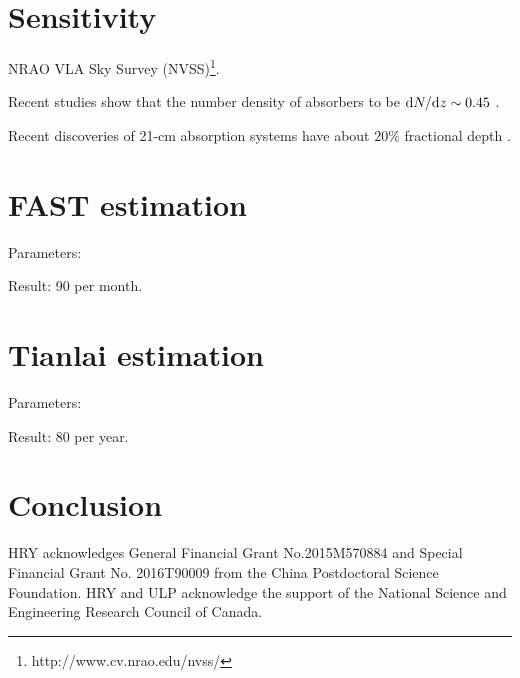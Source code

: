 \documentclass[]{raa}
\newcommand{\diff}{{\rm d}}
\begin{document}
\section{Sensitivity}\label{sec.sensitivity}

NRAO VLA Sky Survey (NVSS)\footnote{http://www.cv.nrao.edu/nvss/}.

Recent studies show that the number density of absorbers to be $\diff N/\diff z\sim 0.45$
\citep{2005ARA&A..43..861W,2007ASSP....3..501Z}.

Recent discoveries of 21-cm absorption systems have about $20\%$ fractional depth
\citep{2015MNRAS.453.1249A,2015MNRAS.453.1268Z}.




\section{FAST estimation}\label{sec.FAST}

Parameters:



Result: 90 per month.

\section{Tianlai estimation}\label{sec.Tianlai}

Parameters:

Result: 80 per year.

\section{Conclusion}\label{sec.conclusion}

\begin{acknowledgements}
HRY acknowledges General Financial Grant No.2015M570884 and
Special Financial Grant No. 2016T90009 from the China
Postdoctoral Science Foundation.
HRY and ULP acknowledge the support of the
National Science and Engineering Research Council of Canada.
\end{acknowledgements}



\end{document}
